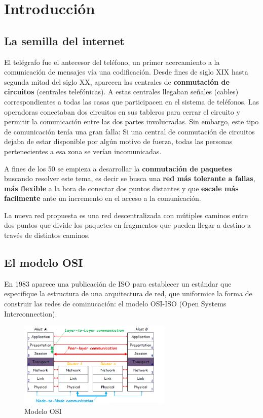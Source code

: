\section{Introducción}
\subsection{La semilla del internet}  
El telégrafo fue el antecesor del teléfono, un primer acercamiento a la comunicación de
mensajes vía una codificación. Desde fines de siglo XIX hasta segunda mitad del siglo XX,
aparecen las centrales de \textbf{conmutación de circuitos} (centrales telefónicas). A estas centrales
llegaban señales (cables) correspondientes a todas las casas que participacen en el sistema de
teléfonos. Las operadoras conectaban dos circuitos en sus tableros para cerrar el circuito y
permitir la comunicación entre las dos partes involucradas. Sin embargo, este tipo de comunicación tenía una gran falla: Si una central de conmutación de circuitos
dejaba de estar disponible por algún motivo de fuerza, todas las personas pertenecientes a esa
zona se verían incomunicadas.


A fines de los 50 se empieza a desarrollar la \textbf{conmutación de paquetes} buscando resolver este tema, es decir se busca una \textbf{red más tolerante a fallas}, \textbf{más flexible} a la hora de conectar dos puntos distantes y que \textbf{escale más facilmente} ante un incremento en el acceso a la comunicación.

La nueva red propuesta es una red descentralizada con mútiples caminos entre dos puntos que divide los paquetes en fragmentos que pueden llegar a destino a través de distintos caminos.

\subsection*{El modelo OSI}
En 1983 aparece una publicación de ISO para establecer un estándar que especifique la estructura de una arquitectura de red, que uniformice la forma de construir las redes de cominucación: el modelo OSI-ISO (Open Systems Interconnection).

\begin{figure}[h]
	\centering
	\includegraphics[width=0.65\textwidth
]{images/osi.png}
	\caption[Modelo OSI de Referencia]{Modelo OSI}
	\label{fig:osi}
\end{figure}

